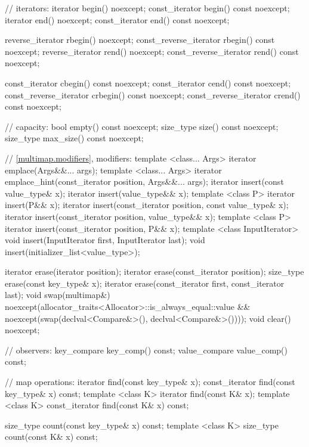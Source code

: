 \begin{codeblock}
{{    // iterators:
    iterator               begin() noexcept;
    const_iterator         begin() const noexcept;
    iterator               end() noexcept;
    const_iterator         end() const noexcept;

    reverse_iterator       rbegin() noexcept;
    const_reverse_iterator rbegin() const noexcept;
    reverse_iterator       rend() noexcept;
    const_reverse_iterator rend() const noexcept;

    const_iterator         cbegin() const noexcept;
    const_iterator         cend() const noexcept;
    const_reverse_iterator crbegin() const noexcept;
    const_reverse_iterator crend() const noexcept;

    // capacity:
    bool      empty() const noexcept;
    size_type size() const noexcept;
    size_type max_size() const noexcept;

    // \ref{multimap.modifiers}, modifiers:
    template <class... Args> iterator emplace(Args&&... args);
    template <class... Args> iterator emplace_hint(const_iterator position, Args&&... args);
    iterator insert(const value_type& x);
    iterator insert(value_type&& x);
    template <class P> iterator insert(P&& x);
    iterator insert(const_iterator position, const value_type& x);
    iterator insert(const_iterator position, value_type&& x);
    template <class P> iterator insert(const_iterator position, P&& x);
    template <class InputIterator>
      void insert(InputIterator first, InputIterator last);
    void insert(initializer_list<value_type>);

    iterator  erase(iterator position);
    iterator  erase(const_iterator position);
    size_type erase(const key_type& x);
    iterator  erase(const_iterator first, const_iterator last);
    void      swap(multimap&)
      noexcept(allocator_traits<Allocator>::is_always_equal::value &&
               noexcept(swap(declval<Compare&>(), declval<Compare&>())));
    void      clear() noexcept;

    // observers:
    key_compare key_comp() const;
    value_compare value_comp() const;

    // map operations:
    iterator       find(const key_type& x);
    const_iterator find(const key_type& x) const;
    template <class K> iterator       find(const K& x);
    template <class K> const_iterator find(const K& x) const;

    size_type      count(const key_type& x) const;
    template <class K> size_type count(const K& x) const;

}}
\end{codeblock}
